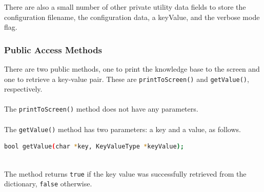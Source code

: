 \documentclass{CSSRforAfrica}
\begin{document}
There are also a small number of other private utility data fields to store the configuration filename, the configuration data, a keyValue, and the verbose mode flag.

\newpage 

\subsubsection{Public Access Methods}
There are two public methods, one to print the knowledge base to the screen  and one to retrieve a key-value pair. These are {\small \tt printToScreen()} and  {\small \tt getValue()}, respectively.
~\\~\\
The {\small \tt printToScreen()} method does not have any parameters.
~\\~\\
The  {\small \tt getValue()}  method has two parameters: a key and a value, as follows.
~\\
\begin{lstlisting}[style=withoutNumbering, language=bash] 
bool getValue(char *key, KeyValueType *keyValue);
\end{lstlisting}
~\\
\noindent The method returns {\small \tt true} if the key value was successfully retrieved from the dictionary, {\small \tt false} otherwise.

\newpage
\end{document}
